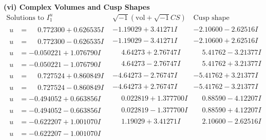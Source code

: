 \documentclass[1p]{elsarticle_modified}
\theoremstyle{definition}
\newcommand{\I}{\sqrt{-1}}
\begin{document}
\newpage\flushleft \textbf{(vi) Complex Volumes and Cusp Shapes}
$$\begin{array}{c|c|c}  
\text{Solutions to }I^u_{1}& \I (\text{vol} + \sqrt{-1}CS) & \text{Cusp shape}\\
 \hline 
\begin{aligned}
u &= \phantom{-}0.772300 + 0.626535 I\end{aligned}
 & -1.19029 + 3.41271 I & -2.10600 - 2.62516 I \\ \hline\begin{aligned}
u &= \phantom{-}0.772300 - 0.626535 I\end{aligned}
 & -1.19029 - 3.41271 I & -2.10600 + 2.62516 I \\ \hline\begin{aligned}
u &= -0.050221 + 1.076790 I\end{aligned}
 & \phantom{-}4.64273 + 2.76747 I & \phantom{-}5.41762 - 3.21377 I \\ \hline\begin{aligned}
u &= -0.050221 - 1.076790 I\end{aligned}
 & \phantom{-}4.64273 - 2.76747 I & \phantom{-}5.41762 + 3.21377 I \\ \hline\begin{aligned}
u &= \phantom{-}0.727524 + 0.860849 I\end{aligned}
 & -4.64273 - 2.76747 I & -5.41762 + 3.21377 I \\ \hline\begin{aligned}
u &= \phantom{-}0.727524 - 0.860849 I\end{aligned}
 & -4.64273 + 2.76747 I & -5.41762 - 3.21377 I \\ \hline\begin{aligned}
u &= -0.494052 + 0.663856 I\end{aligned}
 & \phantom{-}0.022819 + 1.377700 I & \phantom{-}0.88590 - 4.12207 I \\ \hline\begin{aligned}
u &= -0.494052 - 0.663856 I\end{aligned}
 & \phantom{-}0.022819 - 1.377700 I & \phantom{-}0.88590 + 4.12207 I \\ \hline\begin{aligned}
u &= -0.622207 + 1.001070 I\end{aligned}
 & \phantom{-}1.19029 + 3.41271 I & \phantom{-}2.10600 - 2.62516 I \\ \hline\begin{aligned}
u &= -0.622207 - 1.001070 I\end{aligned}

\end{array}$$
\end{document}
